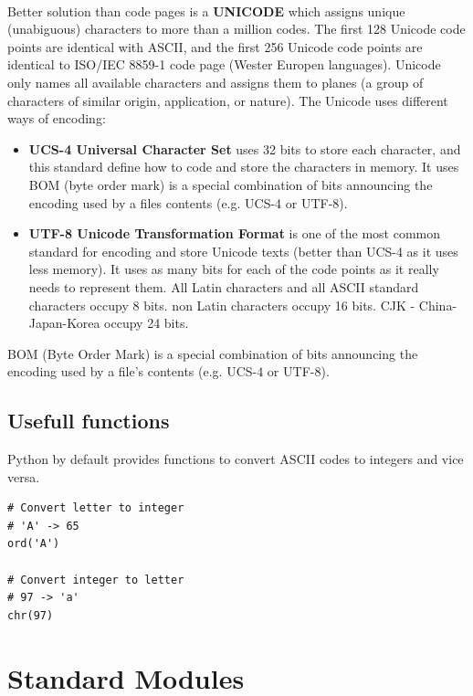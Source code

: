 \documentclass{article}
\begin{document}
\paragraph{}
Better solution than code pages is a \textbf{UNICODE} which assigns unique (unabiguous) characters to more than a million codes. The first 128 Unicode code points are identical with ASCII, and the first 256 Unicode code points are identical to ISO/IEC 8859-1 code page (Wester Europen languages). Unicode only names all available characters and assigns them to planes (a group of characters of similar origin, application, or nature). The Unicode uses different ways of encoding:
\begin{itemize}
\item \textbf{UCS-4 Universal Character Set} uses 32 bits to store each character, and this standard define how to code and store the characters in memory. It uses BOM (byte order mark) is a special combination of bits announcing the encoding used by a files contents (e.g. UCS-4 or UTF-8).
\item \textbf{UTF-8 Unicode Transformation Format} is one of the most common standard for encoding and store Unicode texts (better than UCS-4 as it uses less memory). It uses as many bits for each of the code points as it really needs to represent them. All Latin characters and all ASCII standard characters occupy 8 bits. non Latin characters occupy 16 bits. CJK - China-Japan-Korea occupy 24 bits.
\end{itemize}
BOM (Byte Order Mark) is a special combination of bits announcing the encoding used by a file's contents (e.g. UCS-4 or UTF-8).


\subsection{Usefull functions}
Python by default provides functions to convert ASCII codes to integers and vice versa. 
\begin{lstlisting}[style=pystyle]
# Convert letter to integer
# 'A' -> 65
ord('A')

# Convert integer to letter
# 97 -> 'a'
chr(97) 
\end{lstlisting}



\newpage
\section{Standard Modules}
\end{document}
